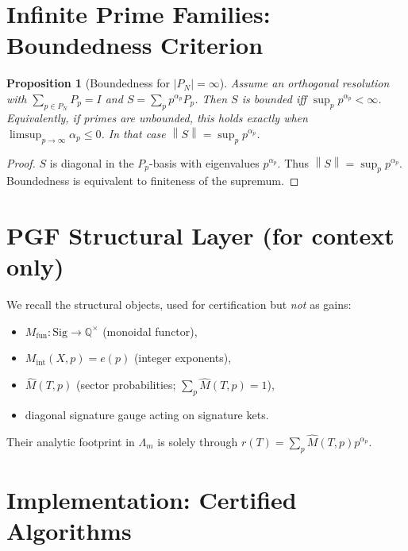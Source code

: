 \documentclass[11pt]{article}
\newtheorem{proposition}[theorem]{Proposition}
\theoremstyle{definition}
\newcommand{\Sig}{\mathrm{Sig}}
\newcommand{\Mfun}{M_{\mathrm{fun}}}
\newcommand{\Mint}{M_{\mathrm{int}}}
\newcommand{\Mhat}{\widehat{M}}
\newcommand{\Lm}{\Lambda_m}
\newcommand{\norm}[1]{\left\lVert #1\right\rVert}
\begin{document}
\section{Infinite Prime Families: Boundedness Criterion}
\begin{proposition}[Boundedness for $|P_N|=\infty$]\label{prop:infinite}
Assume an orthogonal resolution with $\sum_{p\in P_N}P_p=I$ and $S=\sum_p p^{\alpha_p}P_p$. Then $S$ is bounded iff $\sup_p p^{\alpha_p}<\infty$. Equivalently, if primes are unbounded, this holds exactly when $\limsup_{p\to\infty}\alpha_p\le 0$. In that case $\norm{S}=\sup_p p^{\alpha_p}$.
\end{proposition}
\begin{proof}
$S$ is diagonal in the $P_p$-basis with eigenvalues $p^{\alpha_p}$. Thus $\norm{S}=\sup_p p^{\alpha_p}$. Boundedness is equivalent to finiteness of the supremum.
\end{proof}

\section{PGF Structural Layer (for context only)}
We recall the structural objects, used for certification but \emph{not} as gains:
\begin{itemize}[leftmargin=*,nosep]
  \item $\Mfun:\Sig\to\mathbb{Q}^{\times}$ (monoidal functor),
  \item $\Mint(X,p)=e(p)$ (integer exponents),
  \item $\Mhat(T,p)$ (sector probabilities; $\sum_p \Mhat(T,p)=1$),
  \item diagonal signature gauge acting on signature kets.
\end{itemize}
Their analytic footprint in $\Lm$ is solely through $r(T)=\sum_p \Mhat(T,p) p^{\alpha_p}$.

\section{Implementation: Certified Algorithms}
\end{document}
